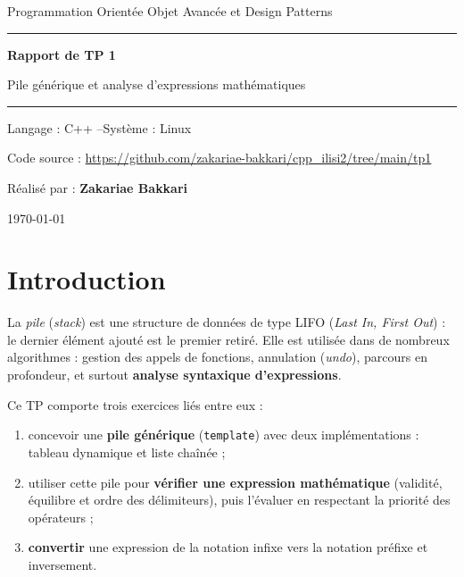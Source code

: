 \documentclass[11pt,a4paper]{article}
\newcommand{\code}[1]{\texttt{#1}}
\begin{document}
\begin{titlepage}
  \centering
  \vspace*{2cm}
  {\large Programmation Orientée Objet Avancée et Design Patterns\par}
  \vspace{1.5cm}
  \rule{\linewidth}{0.6pt}\par\vspace{0.4cm}
  {\Huge\bfseries Rapport de TP 1\par}
  \vspace{0.3cm}
  {\LARGE Pile générique et analyse d'expressions mathématiques\par}
  \vspace{0.4cm}
  \rule{\linewidth}{0.6pt}\par
  \vspace{1.5cm}
  {\large Langage : C++ \quad--\quad Système : Linux\par}
  \vspace{0.4cm}
  {\normalsize Code source : \url{https://github.com/zakariae-bakkari/cpp_ilisi2/tree/main/tp1}\par}
  \vfill
  {\large Réalisé par : \textbf{Zakariae Bakkari}\par}
  \vspace{1cm}
  {\large \today\par}
\end{titlepage}

\tableofcontents
\newpage

\section{Introduction}

La \emph{pile} (\emph{stack}) est une structure de données de type LIFO
(\emph{Last In, First Out}) : le dernier élément ajouté est le premier retiré.
Elle est utilisée dans de nombreux algorithmes : gestion des appels de fonctions,
annulation (\emph{undo}), parcours en profondeur, et surtout
\textbf{analyse syntaxique d'expressions}.

Ce TP comporte trois exercices liés entre eux :
\begin{enumerate}
  \item concevoir une \textbf{pile générique} (\code{template}) avec deux
        implémentations : tableau dynamique et liste chaînée ;
  \item utiliser cette pile pour \textbf{vérifier une expression mathématique}
        (validité, équilibre et ordre des délimiteurs), puis l'évaluer en
        respectant la priorité des opérateurs ;
  \item \textbf{convertir} une expression de la notation infixe
        vers la notation préfixe et inversement.
\end{enumerate}
\end{document}

